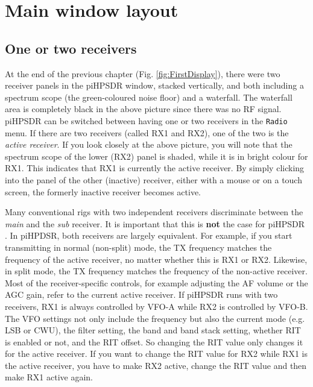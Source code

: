 \documentclass[12pt]{book}
\def\pH{pi\-HPSDR }
\begin{document}
\chapter{Main window layout}

\section{One or two receivers}
At the end of the previous chapter (Fig. \ref{fig:FirstDisplay}),
 there were two receiver panels in the
\pH window, stacked vertically, and both including a spectrum scope
(the green-coloured noise floor) and a waterfall. The waterfall area
is completely black in the above picture since there was no RF signal.
\pH can be switched between having one or two receivers in the
\texttt{Radio} menu. If there are two receivers (called RX1 and RX2),
 one of the two is the \textit{active receiver}. If you look closely
 at the above picture, you will note that the spectrum scope of
 the lower (RX2) panel is shaded, while it is in bright colour for RX1.
 This indicates that RX1 is currently the active receiver. By simply
 clicking into the panel of the other (inactive) receiver, either with
 a mouse or on a touch screen, the formerly inactive receiver becomes
 active.

 Many conventional rigs with two independent receivers discriminate
 between the \textit{main} and the \textit{sub} receiver. It is important that
 this is \textbf{not} the case for \pH. In piHPDSR, both  receivers are
 largely equivalent. For example, if you start transmitting in
 normal (non-split) mode, the TX frequency matches the frequency
 of the active receiver, no matter whether this is RX1 or RX2.
 Likewise, in split mode, the TX frequency matches the frequency
 of the non-active receiver. Most of the receiver-specific controls,
 for example adjusting the AF volume or the AGC gain, refer to the
 current active receiver. If \pH runs with two receivers,
 RX1 is always controlled by VFO-A while RX2 is controlled by VFO-B.
 The VFO settings not only include the frequency but also the
 current mode (e.g. LSB or CWU), the filter setting, the band and
 band stack setting, whether RIT is enabled or not, and the RIT
 offset. So changing the RIT value only changes it for the active
 receiver. If you want  to change the RIT value for RX2 while RX1 is
 the active receiver, you have to make RX2 active, change the RIT
 value and then make RX1 active again.
\end{document}
